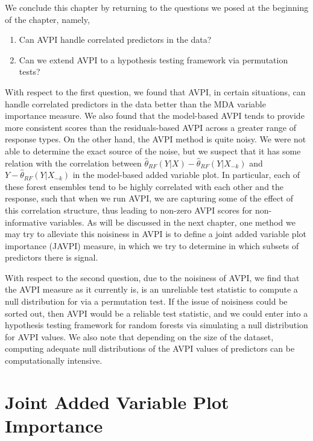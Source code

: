 \documentclass[12pt,twoside]{reedthesis}
\theoremstyle{definition}
\theoremstyle{definition}
\theoremstyle{definition}
\theoremstyle{remark}
\begin{document}
We conclude this chapter by returning to the questions we posed at the
beginning of the chapter, namely,
\begin{enumerate}
  \item Can AVPI handle correlated predictors in the data? 
  \item Can we extend AVPI to a hypothesis testing framework via permutation tests?
\end{enumerate}
With respect to the first question, we found that AVPI, in certain
situations, can handle correlated predictors in the data better than the
MDA variable importance measure. We also found that the model-based AVPI
tends to provide more consistent scores than the residuals-based AVPI
across a greater range of response types. On the other hand, the AVPI
method is quite noisy. We were not able to determine the exact source of
the noise, but we suspect that it has some relation with the correlation
between \(\hat{\theta}_{RF}(Y|X)-\hat{\theta}_{RF}(Y|X_{-k})\) and
\(Y-\hat{\theta}_{RF}(Y|X_{-k})\) in the model-based added variable
plot. In particular, each of these forest ensembles tend to be highly
correlated with each other and the response, such that when we run AVPI,
we are capturing some of the effect of this correlation structure, thus
leading to non-zero AVPI scores for non-informative variables. As will
be discussed in the next chapter, one method we may try to alleviate
this noisiness in AVPI is to define a joint added variable plot
importance (JAVPI) measure, in which we try to determine in which
subsets of predictors there is signal. \par 

With respect to the second question, due to the noisiness of AVPI, we
find that the AVPI measure as it currently is, is an unreliable test
statistic to compute a null distribution for via a permutation test. If
the issue of noisiness could be sorted out, then AVPI would be a
reliable test statistic, and we could enter into a hypothesis testing
framework for random forests via simulating a null distribution for AVPI
values. We also note that depending on the size of the dataset,
computing adequate null distributions of the AVPI values of predictors
can be computationally intensive. \par

\chapter{Joint Added Variable Plot
Importance}\label{joint-added-variable-plot-importance}
\end{document}
